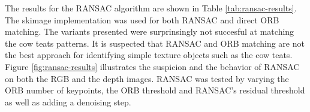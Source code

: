 The results for the RANSAC algorithm are shown in Table \ref{tab:ransac-results}. The skimage implementation was used for both RANSAC and direct ORB matching. The variants presented were surprinsingly not succesful at matching the cow teats patterns. It is suspected that RANSAC and ORB matching are not the best approach for identifying simple texture objects such as the cow teats. 
Figure \ref{fig:ransac-results} illustrates the suspicion and the behavior of RANSAC on both the RGB and the depth images. RANSAC was tested by varying the ORB number of keypoints, the ORB threshold and RANSAC's residual threshold as well as adding a denoising step.  
